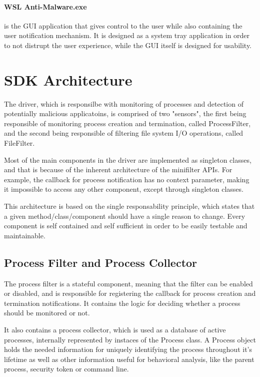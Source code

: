         \paragraph{WSL Anti-Malware.exe}
        is the GUI application that gives control to the user while also containing the user notification mechanism. It is designed as a system
        tray application in order to not distrupt the user experience, while the GUI itself is designed for usability.

    \section{SDK Architecture}
        The driver, which is responsilbe with monitoring of processes and detection of potentially malicious applicatoins, is comprised of
        two "sensors", the first being responsible of monitoring process creation and termination, called ProcessFilter, and the second being
        responsible of filtering file system I/O operations, called FileFilter.

        Most of the main components in the driver are implemented as singleton classes, and that is because of the inherent architecture of
        the minifilter APIs. For example, the callback for process notification has no context parameter, making it impossible to access
        any other component, except through singleton classes.

        This architecture is based on the single responsability principle, which states that a given method/class/component should have a
        single reason to change\cite{CleanCode}. Every component is self contained and self sufficient in order to be easily testable and
        maintainable.

        \subsection{Process Filter and Process Collector}
        The process filter is a stateful component, meaning that the filter can be enabled or disabled, and is responsible for registering
        the callback for process creation and termination notifications. It contains the logic for deciding whether a process should be
        monitored or not.

        It also contains a process collector, which is used as a database of active processes, internally represented by instaces of the Process
        class. A Process object holds the needed information for uniquely identifying the process throughout it's lifetime as well as other
        information useful for behavioral analysis, like the parent process, security token or command line.

